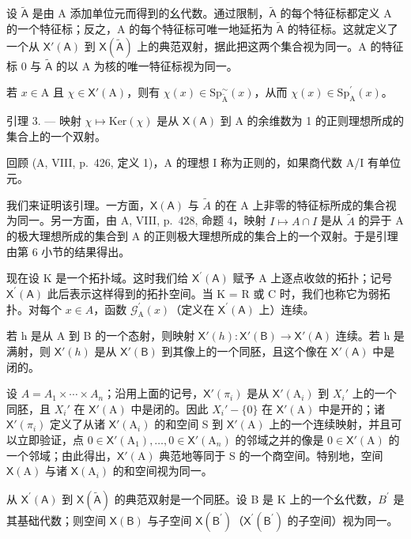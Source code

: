 设 \(\widetilde{\mathsf{A}}\) 是由 A 添加单位元而得到的幺代数。通过限制，\(\widetilde{\mathsf{A}}\) 的每个特征标都定义 A 的一个特征标；反之，A 的每个特征标可唯一地延拓为 \(\widetilde{\mathsf{A}}\) 的特征标。这就定义了一个从 \(\mathsf{X}'(\mathsf{A})\) 到 \(\mathsf{X}(\widetilde{\mathsf{A}})\) 上的典范双射，据此把这两个集合视为同一。A 的特征标 0 与 \(\widetilde{\mathsf{A}}\) 的以 A 为核的唯一特征标视为同一。

若 \(x\in \mathrm{A}\) 且 \(\chi \in \mathsf{X}'(\mathrm{A})\)，则有 \(\chi (x)\in \mathrm{Sp}_{\widetilde{\mathrm{A}}}^{\sim}(x)\)，从而 \(\chi (x)\in \mathrm{Sp}_{\mathrm{A}}^{\prime}(x)\)。

引理 3. --- 映射 \(\chi \mapsto \mathrm{Ker}(\chi)\) 是从 \(\mathsf{X}(\mathsf{A})\) 到 A 的余维数为 1 的正则理想所成的集合上的一个双射。

回顾 (A, VIII, p.~426, 定义 1)，A 的理想 I 称为正则的，如果商代数 A/I 有单位元。

我们来证明该引理。一方面，\(\mathsf{X}(\mathsf{A})\) 与 \(\widetilde{A}\) 的在 A 上非零的特征标所成的集合视为同一。另一方面，由 A, VIII, p.~428, 命题 4，映射 \(I \mapsto A \cap I\) 是从 \(\widetilde{A}\) 的异于 A 的极大理想所成的集合到 A 的正则极大理想所成的集合上的一个双射。于是引理由第 6 小节的结果得出。

现在设 K 是一个拓扑域。这时我们给 \(\mathsf{X}^{\prime}(\mathsf{A})\) 赋予 A 上逐点收敛的拓扑；记号 \(\mathsf{X}^{\prime}(\mathsf{A})\) 此后表示这样得到的拓扑空间。当 K = R 或 C 时，我们也称它为弱拓扑。对每个 \(x \in A\)，函数 \(\mathcal{G}_{\mathrm{A}}^{\prime}(x)\)（定义在 \(\mathsf{X}^{\prime}(\mathsf{A})\) 上）连续。

若 h 是从 A 到 B 的一个态射，则映射 \(\mathsf{X}'(h)\colon\mathsf{X}'(\mathsf{B})\to\mathsf{X}'(\mathsf{A})\) 连续。若 h 是满射，则 \(\mathsf{X}'(h)\) 是从 \(\mathsf{X}'(\mathsf{B})\) 到其像上的一个同胚，且这个像在 \(\mathsf{X}'(\mathsf{A})\) 中是闭的。

设 \(A = A_{1} \times \cdots \times A_{n}\)；沿用上面的记号，\(\mathsf{X}'(\pi_{i})\) 是从 \(\mathsf{X}'(\mathrm{A}_{i})\) 到 \(X_{i}'\) 上的一个同胚，且 \(X_{i}'\) 在 \(\mathsf{X}'(\mathrm{A})\) 中是闭的。因此 \(X_{i}' - \{0\}\) 在 \(\mathsf{X}'(\mathrm{A})\) 中是开的；诸 \(\mathsf{X}'(\pi_{i})\) 定义了从诸 \(\mathsf{X}'(\mathrm{A}_{i})\) 的和空间 S 到 \(\mathsf{X}'(\mathrm{A})\) 上的一个连续映射，并且可以立即验证，点 \(0 \in \mathsf{X}'(\mathrm{A}_{1}), \ldots, 0 \in \mathsf{X}'(\mathrm{A}_{n})\) 的邻域之并的像是 \(0 \in \mathsf{X}'(\mathrm{A})\) 的一个邻域；由此得出，\(\mathsf{X}'(\mathrm{A})\) 典范地等同于 S 的一个商空间。特别地，空间 \(\mathsf{X}(\mathrm{A})\) 与诸 \(\mathsf{X}(\mathrm{A}_{i})\) 的和空间视为同一。

从 \(\mathsf{X}^{\prime}(\mathsf{A})\) 到 \(\mathsf{X}(\tilde{\mathsf{A}})\) 的典范双射是一个同胚。设 B 是 K 上的一个幺代数，\(B^{\prime}\) 是其基础代数；则空间 \(\mathsf{X}(\mathsf{B})\) 与子空间 \(\mathsf{X}(\mathsf{B}^{\prime})\)（\(\mathsf{X}^{\prime}(\mathsf{B}^{\prime})\) 的子空间）视为同一。


